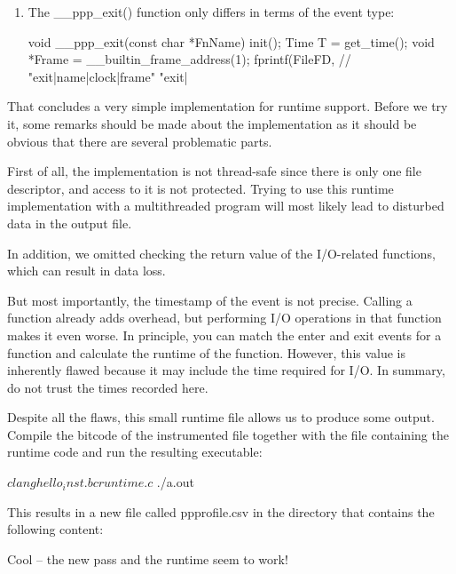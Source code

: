 \begin{enumerate}
\item
The \_\_ppp\_exit() function only differs in terms of the event type:

\begin{cpp}
void __ppp_exit(const char *FnName) {
    init();
    Time T = get_time();
    void *Frame = __builtin_frame_address(1);
    fprintf(FileFD,
    // "exit|name|clock|frame"
    "exit|%
}
\end{cpp}

\end{enumerate}

That concludes a very simple implementation for runtime support. Before we try it, some remarks should be made about the implementation as it should be obvious that there are several problematic parts.

First of all, the implementation is not thread-safe since there is only one file descriptor, and access to it is not protected. Trying to use this runtime implementation with a multithreaded program will most likely lead to disturbed data in the output file.

In addition, we omitted checking the return value of the I/O-related functions, which can result in data loss.

But most importantly, the timestamp of the event is not precise. Calling a function already adds overhead, but performing I/O operations in that function makes it even worse. In principle, you can match the enter and exit events for a function and calculate the runtime of the function. However, this value is inherently flawed because it may include the time required for I/O. In summary, do not trust the times recorded here.

Despite all the flaws, this small runtime file allows us to produce some output. Compile the bitcode of the instrumented file together with the file containing the runtime code and run the resulting executable:

\begin{shell}
$ clang hello_inst.bc runtime.c
$ ./a.out
\end{shell}

This results in a new file called ppprofile.csv in the directory that contains the following content:


Cool – the new pass and the runtime seem to work!

